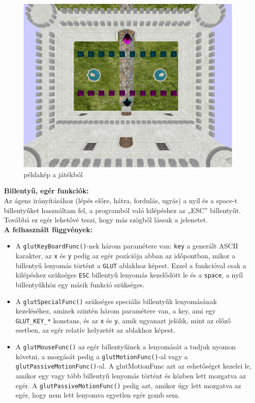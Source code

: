  
\begin{figure}[htp]
    \centering
   	\includegraphics[width=6truecm, height=4truecm]{images/game.png}
	\caption{példakép a játékból}
\end{figure}


{\bf Billentyű, egér funkciók:}\\

Az ágens irányításához (lépés előre, hátra, fordulás, ugrás) a nyíl és a space-t billentyűket használtam fel, a  programból való kilépéshez az „ESC” billentyűt. Továbbá ez egér lehetővé teszi, hogy más szögből lássuk a jelenetet.\\ %

{ \bf A felhasznált függvények:}

\begin{itemize}
\item A \texttt{glutKeyBoardFunc()}-nek három paramétere van: \texttt{key} a generált ASCII karakter, az \texttt{x} és \texttt{y} pedig az egér pozíciója abban az időpontban, mikor a billentyű lenyomás történt a \texttt{GLUT} ablakhoz képest. Ezzel a funkcióval csak a kilépéshez szükséges \texttt{ESC} billentyű lenyomás kezelődött le és a \texttt{space}, a nyíl billentyűkhöz egy másik funkció szükséges.
\item A \texttt{glutSpecialFunc()} szükséges speciális billentyűk lenyomásának kezeléséhez,  
aminek szintén három paramétere van, a key, ami egy \texttt{GLUT\_KEY\_*} konstans, és az \texttt{x} és \texttt{y}, amik ugyanazt jelölik, mint az előző esetben, az egér relatív helyzetét az ablakhoz képest.
\item A \texttt{glutMouseFunc()} az egér billentyűinek a lenyomását a  tudjuk nyomon követni, a mozgását pedig a \texttt{glutMotionFunc()}-al vagy a \texttt{glutPassiveMotionFunc()}-al. A glutMotionFunc azt az eshetőséget kezelei le, amikor egy vagy több billentyű lenyomás történt és közben lett mozgatva az egér. A \texttt{glutPassiveMotionFunc()} pedig azt, amikor úgy lett mozgatva az egér, hogy nem lett lenyomva egyetlen egér gomb sem.  
\end{itemize}
